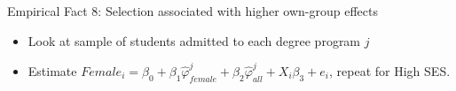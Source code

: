 \documentclass[table,10pt]{beamer}
\begin{document}
\begin{frame}{Empirical Fact 8: Selection associated with higher own-group effects}

\begin{itemize}
\item Look at sample of students admitted to each degree program $j$
\item Estimate  $Female_i=\beta_0+\beta_1 \hat{\varphi}_{female}^{j}+\beta_2 \hat{\varphi}_{all}^{j}+X_i \beta_3+e_i$, repeat for High SES.

\end{itemize}

\end{frame}
\end{document}
